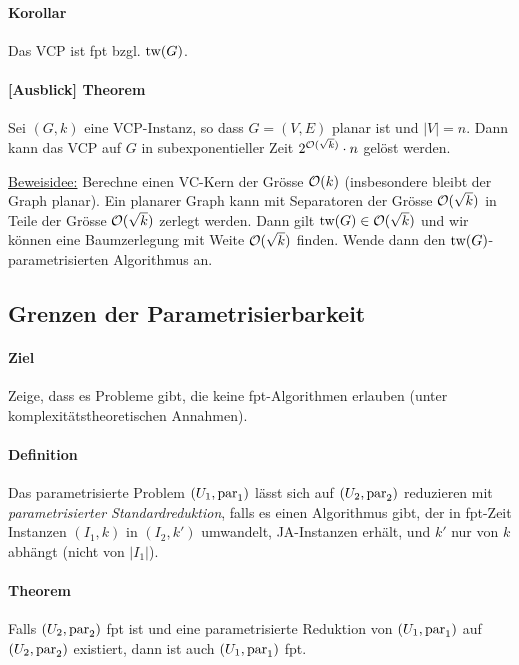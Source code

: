 \paragraph{Korollar}
Das VCP ist fpt bzgl. $\text{tw}(G)$.

\paragraph{[Ausblick] Theorem}
Sei $(G, k)$ eine VCP-Instanz, so dass $G=(V,E)$ planar ist und $|V|=n$.
Dann kann das VCP auf $G$ in subexponentieller Zeit $2^{\mathcal{O} (\sqrt{k})} \cdot n$ gelöst werden.

\underline{Beweisidee:}
Berechne einen VC-Kern der Grösse $\mathcal{O} (k)$ (insbesondere bleibt der Graph planar).
Ein planarer Graph kann mit Separatoren der Grösse $\mathcal{O} (\sqrt{k})$ in Teile der Grösse
$\mathcal{O} (\sqrt{k})$ zerlegt werden.
Dann gilt $\text{tw}(G) \in \mathcal{O} (\sqrt{k})$ und wir können eine Baumzerlegung mit Weite $\mathcal{O} (\sqrt{k})$ finden.
Wende dann den $\text{tw}(G)$-parametrisierten Algorithmus an.


\subsection{Grenzen der Parametrisierbarkeit}

\paragraph{Ziel}
Zeige, dass es Probleme gibt, die keine fpt-Algorithmen erlauben (unter komplexitätstheoretischen Annahmen).

\paragraph{Definition}
Das parametrisierte Problem $(U_1, \text{par}_1)$ lässt sich auf $(U_2, \text{par}_2)$ reduzieren mit
\emph{parametrisierter Standardreduktion}, falls es einen Algorithmus gibt, der in fpt-Zeit
Instanzen $(I_1, k)$ in $(I_2, k')$ umwandelt, JA-Instanzen erhält, und $k'$ nur von $k$ abhängt (nicht von $|I_1|$).

\paragraph{Theorem}
Falls $(U_2, \text{par}_2)$ fpt ist und eine parametrisierte Reduktion von $(U_1, \text{par}_1)$ auf $(U_2, \text{par}_2)$ existiert,
dann ist auch $(U_1, \text{par}_1)$ fpt.

